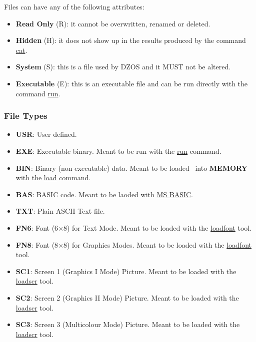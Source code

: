         Files can have any of the following attributes:

        \begin{itemize}
            \item \textbf{Read Only} (R): it cannot be overwritten, renamed or
            deleted.
            \item \textbf{Hidden} (H): it does not show up in the results
            produced by the command \hyperref[cmd:cat]{cat}.
            \item \textbf{System} (S): this is a file used by DZOS and it MUST
            not be altered.
            \item \textbf{Executable} (E): this is an executable file and can be
            run directly with the command \hyperref[cmd:run]{run}.
        \end{itemize}

        \subsubsection{File Types}
        \label{subsub:filetypes}

        \begin{itemize}
            \item \textbf{USR}: User defined.
            \item \textbf{EXE}: Executable binary. Meant to be run with the 
                \hyperref[cmd:run]{run} command.
            \item \textbf{BIN}: Binary (non-executable) data. Meant to be loaded
            \   into \textbf{MEMORY} with the \hyperref[cmd:load]{load} command.
            \item \textbf{BAS}: BASIC code. Meant to be laoded with
                \hyperref[sub:msbasic]{MS BASIC}.
            \item \textbf{TXT}: Plain ASCII Text file.
            \item \textbf{FN6}: Font (6×8) for Text Mode. Meant to be loaded
                with the \hyperref[sub:loadfont]{loadfont} tool.
            \item \textbf{FN8}: Font (8×8) for Graphics Modes. Meant to be
                loaded with the \hyperref[sub:loadfont]{loadfont} tool.
            \item \textbf{SC1}: Screen 1 (Graphics I Mode) Picture. Meant to be
                loaded with the \hyperref[sub:loadscr]{loadscr} tool.
            \item \textbf{SC2}: Screen 2 (Graphics II Mode) Picture. Meant to be
                loaded with the \hyperref[sub:loadscr]{loadscr} tool.
            \item \textbf{SC3}: Screen 3 (Multicolour Mode) Picture. Meant to be
                loaded with the \hyperref[sub:loadscr]{loadscr} tool.
        \end{itemize}

